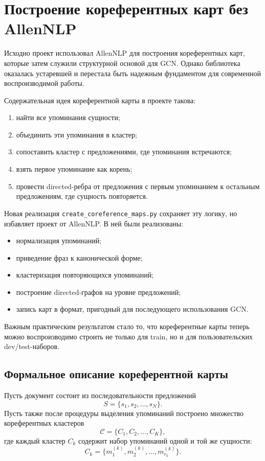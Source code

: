 \documentclass[12pt,a4paper]{article}
\begin{document}
\section{Построение кореферентных карт без AllenNLP}

Исходно проект использовал AllenNLP для построения кореферентных карт, которые затем
служили структурной основой для GCN. Однако библиотека оказалась устаревшей и перестала
быть надежным фундаментом для современной воспроизводимой работы.

Содержательная идея кореферентной карты в проекте такова:

\begin{enumerate}
    \item найти все упоминания сущности;
    \item объединить эти упоминания в кластер;
    \item сопоставить кластер с предложениями, где упоминания встречаются;
    \item взять первое упоминание как корень;
    \item провести directed-ребра от предложения с первым упоминанием к остальным
    предложениям, где сущность повторяется.
\end{enumerate}

Новая реализация \texttt{create\_coreference\_maps.py} сохраняет эту логику, но избавляет
проект от AllenNLP. В ней были реализованы:

\begin{itemize}
    \item нормализация упоминаний;
    \item приведение фраз к канонической форме;
    \item кластеризация повторяющихся упоминаний;
    \item построение directed-графов на уровне предложений;
    \item запись карт в формат, пригодный для последующего использования GCN.
\end{itemize}

Важным практическим результатом стало то, что кореферентные карты теперь можно
воспроизводимо строить не только для train, но и для пользовательских dev/test-наборов.

\subsection{Формальное описание кореферентной карты}

Пусть документ состоит из последовательности предложений
\[
S = \{s_1, s_2, \dots, s_N\}.
\]
Пусть также после процедуры выделения упоминаний построено множество кореферентных
кластеров
\[
\mathcal{C} = \{C_1, C_2, \dots, C_K\},
\]
где каждый кластер $C_k$ содержит набор упоминаний одной и той же сущности:
\[
C_k = \{m_1^{(k)}, m_2^{(k)}, \dots, m_{r_k}^{(k)}\}.
\]
\end{document}
